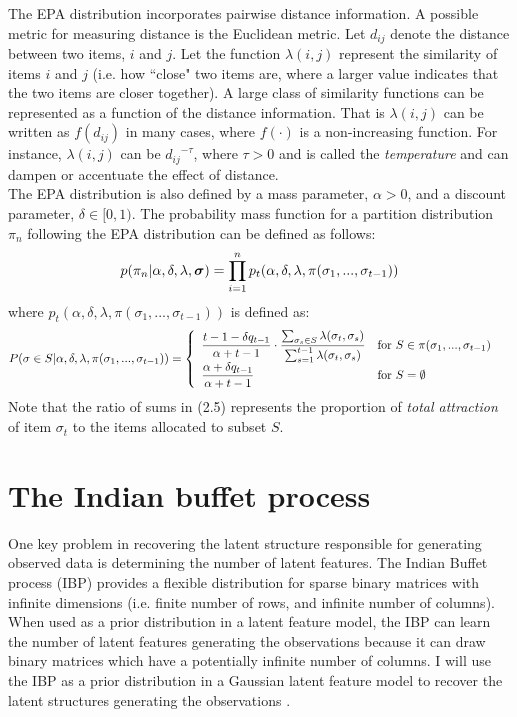 \noindent
The EPA distribution incorporates pairwise distance information. A possible
metric for measuring distance is the Euclidean metric. Let $d_{ij}$ denote the
distance between two items, $i$ and $j$. Let the function $\lambda(i,j)$ represent
the similarity of items $i$ and $j$ (i.e. how ``close" two items are, where a larger
value indicates that the two items are closer together). A large class of similarity
functions can be represented as a function of the distance information. That is
$\lambda(i,j)$ can be written as $f(d_{ij})$ in many cases, where $f(\cdot)$ is a
non-increasing function. For instance, $\lambda(i,j)$ can be ${d_{ij}}^{-\tau}$,
where $\tau>0$ and is called the \textit{temperature} and can dampen or
accentuate the effect of distance.\\

\noindent
The EPA distribution is also defined by a mass parameter, $\alpha > 0$, and a
discount parameter, $\delta \in [0,1)$. The probability mass function for a
partition distribution $\pi_n$ following the EPA distribution can be defined as
follows:
\begin{equation}
  p(\pi_n|\alpha,\delta,\lambda,\bm\sigma)=
    \prod\limits_{i=1}^{n}p_t(\alpha,\delta,\lambda,\pi(\sigma_1,...,\sigma_{t-1}))
\end{equation}
where $p_t(\alpha,\delta,\lambda,\pi(\sigma_1,...,\sigma_{t-1}))$ is defined as:
\begin{equation}
  P(\sigma \in S | \alpha,\delta,\lambda,\pi(\sigma_1,...,\sigma_{t-1}))=
  \begin{cases}
    \begin{array}{ll}
      \displaystyle\frac{t-1-\delta q_{t-1}}{\alpha+t-1} \cdot 
        \frac{\sum_{\sigma_s \in S}\lambda(\sigma_t,\sigma_s)}
        {\sum_{s=1}^{t-1}\lambda(\sigma_t,\sigma_s)} & 
        \text{for }S \in \pi(\sigma_1,...,\sigma_{t-1})\\
      \displaystyle\frac{\alpha+\delta q_{t-1}}{\alpha+t-1} &  \text{for }S  = \emptyset \\
    \end{array}
  \end{cases}
\end{equation}
Note that the ratio of sums in (2.5) represents the proportion of \textit{total
attraction} of item $\sigma_t$ to the items allocated to subset $S$.


\section{The Indian buffet process}
One key problem in recovering the latent structure responsible for generating
observed data is determining the number of latent features. The Indian Buffet
process (IBP) provides a flexible distribution for sparse binary matrices with
infinite dimensions (i.e. finite number of rows, and infinite number of columns).
When used as a prior distribution in a latent feature model, the IBP can
learn the number of latent features generating the observations because it can
draw binary matrices which have a potentially infinite number of columns. I will
use the IBP as a prior distribution in a Gaussian latent feature model to
recover the latent structures generating the observations \cite{ibp}.\\


